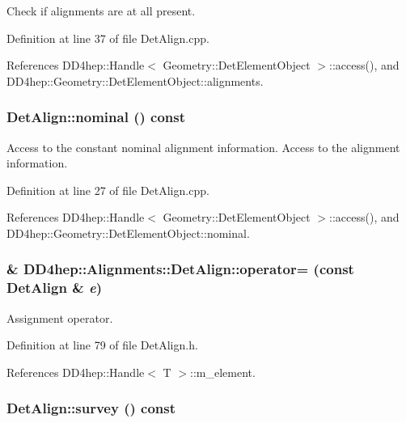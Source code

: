Check if alignments are at all present. 

Definition at line 37 of file DetAlign.cpp.

References DD4hep::Handle$<$ Geometry::DetElementObject $>$::access(), and DD4hep::Geometry::DetElementObject::alignments.\hypertarget{class_d_d4hep_1_1_alignments_1_1_det_align_a32509c66001a245a250aea41ab717cb2}{
\subsubsection[{nominal}]{ DetAlign::nominal () const}}
\label{class_d_d4hep_1_1_alignments_1_1_det_align_a32509c66001a245a250aea41ab717cb2}


Access to the constant nominal alignment information. Access to the alignment information. 

Definition at line 27 of file DetAlign.cpp.

References DD4hep::Handle$<$ Geometry::DetElementObject $>$::access(), and DD4hep::Geometry::DetElementObject::nominal.\hypertarget{class_d_d4hep_1_1_alignments_1_1_det_align_a9672376d598c4e583163a1f46f7817d0}{
\subsubsection[{operator=}]{\& DD4hep::Alignments::DetAlign::operator= (const {\bf DetAlign} \& {\em e})}}
\label{class_d_d4hep_1_1_alignments_1_1_det_align_a9672376d598c4e583163a1f46f7817d0}


Assignment operator. 

Definition at line 79 of file DetAlign.h.

References DD4hep::Handle$<$ T $>$::m\_\-element.\hypertarget{class_d_d4hep_1_1_alignments_1_1_det_align_adbf0dea0867ee6179de59e58c36d300d}{
\subsubsection[{survey}]{ DetAlign::survey () const}}
\label{class_d_d4hep_1_1_alignments_1_1_det_align_adbf0dea0867ee6179de59e58c36d300d}


